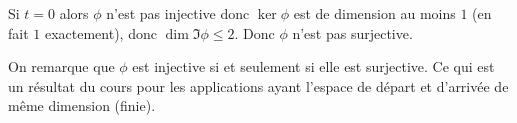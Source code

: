 {{Si $t = 0$ alors $\phi$ n'est pas injective donc $\ker \phi$ est de dimension au moins $1$
(en fait $1$ exactement), donc  $\dim \Im \phi \leqslant 2$. Donc $\phi$ n'est pas surjective.


On remarque que $\phi$ est injective si et seulement si elle est surjective.
Ce qui est un r\'esultat du cours pour les applications ayant l'espace 
de d\'epart et d'arriv\'ee de m\^eme dimension (finie).
}
}
